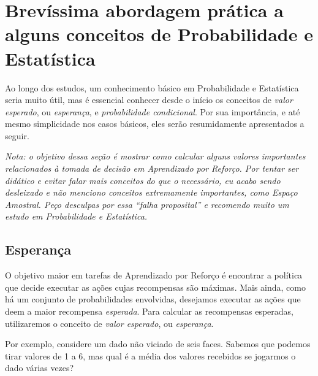 \documentclass{article}
\begin{document}
    \section{Brevíssima abordagem prática a alguns conceitos de Probabilidade e Estatística}
    \label{sec:probabilidade}
    
        Ao longo dos estudos, um conhecimento básico em Probabilidade e Estatística seria muito útil, mas é essencial conhecer desde o início os conceitos de \emph{valor esperado}, ou \emph{esperança}, e \emph{probabilidade condicional}. Por sua importância, e até mesmo simplicidade nos casos básicos, eles serão resumidamente apresentados a seguir.
        
        \textit{Nota: o objetivo dessa seção é mostrar como calcular alguns valores importantes relacionados à tomada de decisão em Aprendizado por Reforço. Por tentar ser didático e evitar falar mais conceitos do que o necessário, eu acabo sendo desleixado e não menciono conceitos extremamente importantes, como \emph{Espaço Amostral}. Peço desculpas por essa ``falha proposital'' e recomendo muito um estudo em Probabilidade e Estatística.}
            
        \subsection{Esperança}
            
            O objetivo maior em tarefas de Aprendizado por Reforço é encontrar a política que decide executar as ações cujas recompensas são máximas. Mais ainda, como há um conjunto de probabilidades envolvidas, desejamos executar as ações que deem a maior recompensa \emph{esperada}. Para calcular as recompensas esperadas, utilizaremos o conceito de \emph{valor esperado}, ou \emph{esperança}.
            
            Por exemplo, considere um dado não viciado de seis faces. Sabemos que podemos tirar valores de 1 a 6, mas qual é a média dos valores recebidos se jogarmos o dado várias vezes?
            
\end{document}
